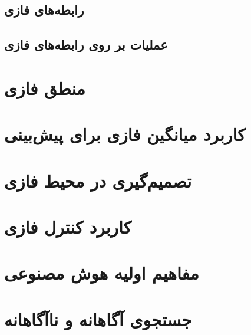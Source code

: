 \documentclass[12pt,a4paper]{article}
\theoremstyle{definition}
\begin{document}
 \subsection{رابطه‌های فازی}
 \subsection{عملیات بر روی رابطه‌های فازی}
\section{منطق فازی}
\section{کاربرد میانگین فازی برای پیش‌بینی}
\section{تصمیم‌گیری در محیط فازی}
\section{کاربرد کنترل فازی}
\section{مفاهیم اولیه هوش مصنوعی}
\section{جستجوی آگاهانه و ناآگاهانه}


\end{document}
